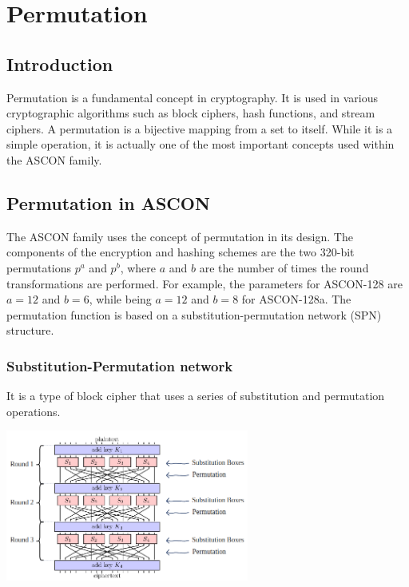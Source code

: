 
\section{Permutation}
\subsection{Introduction}

Permutation is a fundamental concept in cryptography. It is used in various cryptographic algorithms such as block ciphers, hash functions, and stream ciphers. A permutation is a bijective mapping from a set to itself. While it is a simple operation, it is actually one of the most important concepts used within the ASCON family. \par


\subsection{Permutation in ASCON}
The ASCON family uses the concept of permutation in its design. The components of the encryption and hashing schemes are the two 320-bit permutations $p^a$ and $p^b$, where $a$ and $b$ are the number of times the round transformations are performed. For example, the parameters for ASCON-128 are $a = 12$ and $b = 6$, while being $a = 12$ and $b = 8$ for ASCON-128a. The permutation function is based on a substitution-permutation network (SPN) structure. \cite{DBLP:journals/joc/DobraunigEMS21, ascon_specification} \par

\subsubsection{Substitution-Permutation network}

It is a type of block cipher that uses a series of substitution and permutation operations.


\begin{center}
  \centering 
  \includegraphics[width=0.6\textwidth]{images/spn.png}
  \label{fig:spn}
\end{center}

